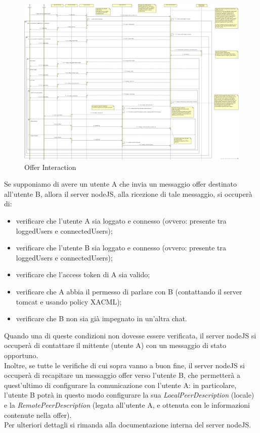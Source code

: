 \begin{figure}[H]
	\centering
	\includegraphics[scale = .6]{img/sequence_offer.png}
	\caption{Offer Interaction}
	\label{gfx:offerinteraction}
\end{figure}

Se supponiamo di avere un utente A che invia un messaggio offer destinato all'utente B, allora il server nodeJS, alla ricezione di tale messaggio, si occuperà di:
\begin{itemize}
\item verificare che l'utente A sia loggato e connesso (ovvero: presente tra loggedUsers e connectedUsers);
\item verificare che l'utente B sia loggato e connesso (ovvero: presente tra loggedUsers e connectedUsers);
\item verificare che l'access token di A sia valido;
\item verificare che A abbia il permesso di parlare con B (contattando il server tomcat e usando policy XACML);
\item verificare che B non sia già impegnato in un'altra chat.
\end{itemize}

Quando una di queste condizioni non dovesse essere verificata, il server nodeJS si occuperà di contattare il mittente (utente A) con un messaggio di stato opportuno.\\
Inoltre, se tutte le verifiche di cui sopra vanno a buon fine, il server nodeJS si occuperà di recapitare un messaggio offer verso l'utente B, che permetterà a quest'ultimo di configurare la comunicazione con l'utente A: in particolare, l'utente B potrà in questo modo configurare la sua \textit{LocalPeerDescription} (locale) e la \textit{RemotePeerDescription} (legata all'utente A, e ottenuta con le informazioni contenute nella offer).\\
Per ulteriori dettagli si rimanda alla documentazione interna del server nodeJS.\\


